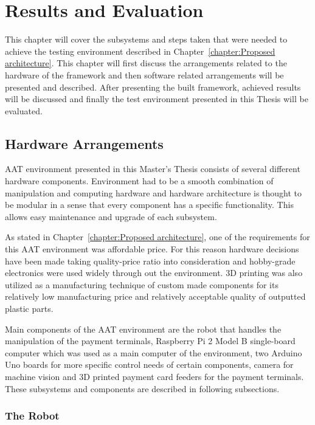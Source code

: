 
\chapter{Results and Evaluation}
\label{chapter:Results and Evaluation}

This chapter will cover the subsystems and steps taken that were needed to achieve the testing environment described in Chapter~\ref{chapter:Proposed architecture}. This chapter will first discuss the arrangements related to the hardware of the framework and then software related arrangements will be presented and described. After presenting the built framework, achieved results will be discussed and finally the test environment presented in this Thesis will be evaluated.

\section{Hardware Arrangements}
\label{section:Hardware arrangements}

AAT environment presented in this Master's Thesis consists of several different hardware components. Environment had to be a smooth combination of manipulation and computing hardware and hardware architecture is thought to be modular in a sense that every component has a specific functionality. This allows easy maintenance and upgrade of each subsystem.

As stated in Chapter~\ref{chapter:Proposed architecture}, one of the requirements for this AAT environment was affordable price. For this reason hardware decisions have been made taking quality-price ratio into consideration and hobby-grade electronics were used widely through out the environment. 3D printing was also utilized as a manufacturing technique of custom made components for its relatively low manufacturing price and relatively acceptable quality of outputted plastic parts.

Main components of the AAT environment are the robot that handles the manipulation of the payment terminals, Raspberry Pi 2 Model B single-board computer which was used as a main computer of the environment, two Arduino Uno boards for more specific control needs of certain components, camera for machine vision and 3D printed payment card feeders for the payment terminals. These subsystems and components are described in following subsections.

\subsection{The Robot}
\label{subsection:Robot}

